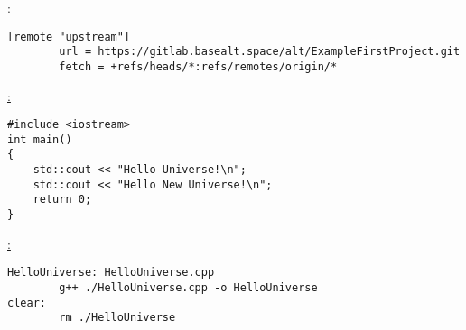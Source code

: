 \noindent\underline{:}
\begin{verbatim}
[remote "upstream"]
        url = https://gitlab.basealt.space/alt/ExampleFirstProject.git
        fetch = +refs/heads/*:refs/remotes/origin/*

\end{verbatim}

\noindent\underline{:}
\begin{verbatim}
#include <iostream>
int main()
{
    std::cout << "Hello Universe!\n";
    std::cout << "Hello New Universe!\n";
    return 0;
}

\end{verbatim}

\noindent\underline{:}
\begin{verbatim}
HelloUniverse: HelloUniverse.cpp
        g++ ./HelloUniverse.cpp -o HelloUniverse
clear:
        rm ./HelloUniverse
\end{verbatim}
